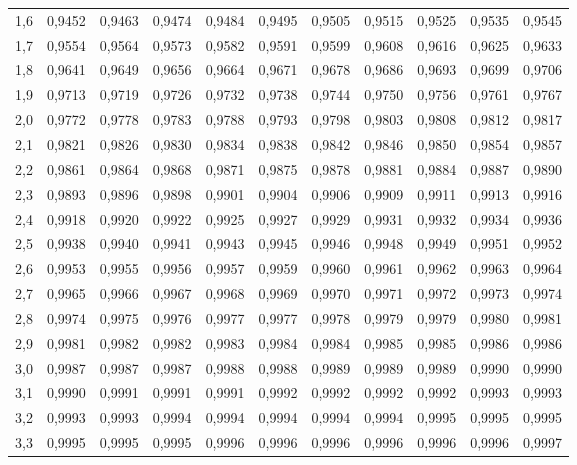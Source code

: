 \begin{table}[h!]
\begin{scriptsize}
\begin{tabular}{c|cccccccccc}
        1,6 & 0,9452 & 0,9463 & 0,9474 & 0,9484 & 0,9495 & 0,9505 & 0,9515 & 0,9525 & 0,9535 & 0,9545 \\
        1,7 & 0,9554 & 0,9564 & 0,9573 & 0,9582 & 0,9591 & 0,9599 & 0,9608 & 0,9616 & 0,9625 & 0,9633 \\
        1,8 & 0,9641 & 0,9649 & 0,9656 & 0,9664 & 0,9671 & 0,9678 & 0,9686 & 0,9693 & 0,9699 & 0,9706 \\
        1,9 & 0,9713 & 0,9719 & 0,9726 & 0,9732 & 0,9738 & 0,9744 & 0,9750 & 0,9756 & 0,9761 & 0,9767 \\
        2,0 & 0,9772 & 0,9778 & 0,9783 & 0,9788 & 0,9793 & 0,9798 & 0,9803 & 0,9808 & 0,9812 & 0,9817 \\
        2,1 & 0,9821 & 0,9826 & 0,9830 & 0,9834 & 0,9838 & 0,9842 & 0,9846 & 0,9850 & 0,9854 & 0,9857 \\
        2,2 & 0,9861 & 0,9864 & 0,9868 & 0,9871 & 0,9875 & 0,9878 & 0,9881 & 0,9884 & 0,9887 & 0,9890 \\
        2,3 & 0,9893 & 0,9896 & 0,9898 & 0,9901 & 0,9904 & 0,9906 & 0,9909 & 0,9911 & 0,9913 & 0,9916 \\
        2,4 & 0,9918 & 0,9920 & 0,9922 & 0,9925 & 0,9927 & 0,9929 & 0,9931 & 0,9932 & 0,9934 & 0,9936 \\
        2,5 & 0,9938 & 0,9940 & 0,9941 & 0,9943 & 0,9945 & 0,9946 & 0,9948 & 0,9949 & 0,9951 & 0,9952 \\
        2,6 & 0,9953 & 0,9955 & 0,9956 & 0,9957 & 0,9959 & 0,9960 & 0,9961 & 0,9962 & 0,9963 & 0,9964 \\
        2,7 & 0,9965 & 0,9966 & 0,9967 & 0,9968 & 0,9969 & 0,9970 & 0,9971 & 0,9972 & 0,9973 & 0,9974 \\
        2,8 & 0,9974 & 0,9975 & 0,9976 & 0,9977 & 0,9977 & 0,9978 & 0,9979 & 0,9979 & 0,9980 & 0,9981 \\
        2,9 & 0,9981 & 0,9982 & 0,9982 & 0,9983 & 0,9984 & 0,9984 & 0,9985 & 0,9985 & 0,9986 & 0,9986 \\
        3,0 & 0,9987 & 0,9987 & 0,9987 & 0,9988 & 0,9988 & 0,9989 & 0,9989 & 0,9989 & 0,9990 & 0,9990 \\
        3,1 & 0,9990 & 0,9991 & 0,9991 & 0,9991 & 0,9992 & 0,9992 & 0,9992 & 0,9992 & 0,9993 & 0,9993 \\
        3,2 & 0,9993 & 0,9993 & 0,9994 & 0,9994 & 0,9994 & 0,9994 & 0,9994 & 0,9995 & 0,9995 & 0,9995 \\
        3,3 & 0,9995 & 0,9995 & 0,9995 & 0,9996 & 0,9996 & 0,9996 & 0,9996 & 0,9996 & 0,9996 & 0,9997 \\

\end{tabular}
\end{scriptsize}
\end{table}
